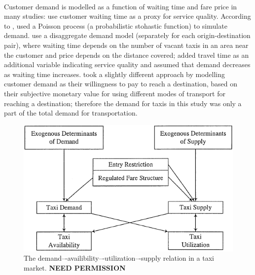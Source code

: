 \paragraph{}Customer demand is modelled as a function of waiting time and fare
price in many studies: \textcite{Douglas1972taxi+regulation,
Devany1975taxi+capacity, Cairns1996taxi+competition, Yang2002taxi+demand} use
customer waiting time as a proxy for service quality. According to
\textcite{Salanova2011taxi+review}, \textcite{Manski1967taxi+demand} used a
Poisson process (a probabilistic stohastic function) to simulate demand.
\textcite{Yang2002taxi+demand} use a disaggregate demand model (separately for
each origin-destination pair), where waiting time depends on the number of
vacant taxis in an area near the customer and price depends on the distance
covered; \textcite{Yang2010taxi+nonlinear} added travel time as an additional
variable indicating service quality and assumed that demand decreases as
waiting time increases. \textcite{Yang2010taxi+equilibria} took a slightly
different approach by modelling customer demand as their willingness to pay to
reach a destination, based on their subjective monetary value for using
different modes of transport for reaching a destination; therefore the demand
for taxis in this study was only a part of the total demand for transportation.


\begin{figure}
  \begin{center}
    \includegraphics{../figures/taxi_demand}
    \caption{
      The demand–-availibility–-utilization–-supply relation in a taxi market. 
      \textbf{NEED PERMISSION}
      \label{figure:taxi}
    }
  \end{center}
\end{figure}
